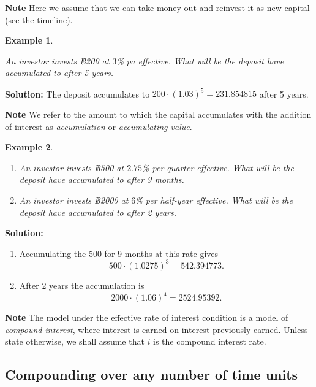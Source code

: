 \documentclass[landscape, 20pt]{extreport}
\theoremstyle{definition}
\theoremstyle{definition}
\newtheorem{example}{Example}[chapter]
\theoremstyle{definition}
\theoremstyle{definition}
\theoremstyle{remark}
\begin{document}
\textbf{Note} Here we assume that we can take money out and reinvest it as
new capital (see the timeline).

\newpage \begin{example}
\protect\hypertarget{exm:unlabeled-div-7}{}\label{exm:unlabeled-div-7}

\emph{An investor invests ฿200 at \(3\)\% pa effective. What
will be the deposit have accumulated to after 5 years.}

\end{example}

\textbf{Solution:} The deposit accumulates to
\(200 \cdot (1.03)^5 = 231.854815\) after 5 years.

\textbf{Note} We refer to the amount to which the capital accumulates with
the addition of interest as \emph{accumulation} or \emph{accumulating value}.

\newpage \begin{example}
\protect\hypertarget{exm:unlabeled-div-8}{}\label{exm:unlabeled-div-8}

\begin{enumerate}
\def\labelenumi{\arabic{enumi}.}
\item
  \emph{An investor invests ฿500 at \(2.75\)\% per quarter effective. What
  will be the deposit have accumulated to after 9 months.}
\item
  \emph{An investor invests ฿2000 at \(6\)\% per half-year effective. What
  will be the deposit have accumulated to after 2 years.}
\end{enumerate}

\end{example}

\textbf{Solution:}

\begin{enumerate}
\def\labelenumi{\arabic{enumi}.}
\item
  Accumulating the 500 for 9 months at this rate gives
  \[500 \cdot (1.0275)^3 = 542.394773.\]
\item
  After 2 years the accumulation is
  \[2000 \cdot (1.06)^4 = 2524.95392.\]
\end{enumerate}

\textbf{Note} The model under the effective rate of interest condition is a
model of \emph{compound interest}, where interest is earned on interest
previously earned. Unless state otherwise, we shall assume that \(i\) is
the compound interest rate.

\hypertarget{compounding-over-any-number-of-time-units}{%
\subsection{Compounding over any number of time units}\label{compounding-over-any-number-of-time-units}}
\end{document}
